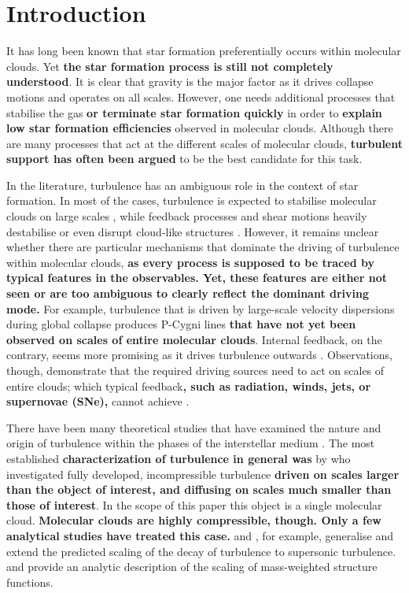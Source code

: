 \section{Introduction}\label{intro}

It has long been known that star formation preferentially occurs within molecular clouds. 
Yet \textbf{the star formation process is still not completely understood}.
It is clear that gravity is the major factor as it drives collapse motions and operates on all scales.
However, one needs additional processes that stabilise the gas \textbf{or terminate star formation quickly} in order to \textbf{explain low star formation efficiencies} observed in molecular clouds. 
Although there are many processes that act at the different scales of molecular clouds, \textbf{turbulent support has often been argued} to be the best candidate for this task.

In the literature, turbulence has an ambiguous role in the context of star formation. 
In most of the cases, turbulence is expected to stabilise molecular clouds on large scales \citep{Fleck1980,McKee1992,MacLow2003}, while feedback processes and shear motions heavily destabilise or even disrupt cloud-like structures \citep{Tan2013,Miyamoto2014}. 
However, it remains unclear whether there are particular mechanisms that dominate the driving of turbulence within molecular clouds, \textbf{as every process is supposed to be traced by typical features in the observables.
Yet, these features are either not seen or are too ambiguous to clearly reflect the dominant driving mode.}
For example, turbulence that is driven by large-scale velocity dispersions during global collapse \citep{Ballesteros2011a,Ballesteros2011b,Hartmann2012} produces P-Cygni lines \textbf{ that have not yet been observed on scales of entire molecular clouds}. 
Internal feedback, on the contrary, seems more promising as it drives turbulence outwards \citep{Dekel2013,Krumholz2014}.
Observations, though, demonstrate that the required driving sources need to act on scales of entire clouds; which typical feedback\textbf{, such as radiation, winds, jets, or supernovae (SNe),} cannot achieve \citep{Heyer2004,Brunt2009,Brunt2013}.

There have been many theoretical studies that have examined the nature and origin of turbulence within the phases of the interstellar medium \citep[ISM;][and references within]{MacLow2004}. 
The most established \textbf{characterization of turbulence in general was} by \citet{Kolmogorov1941} who investigated fully developed, incompressible turbulence \textbf{driven on scales larger than the object of interest, and diffusing on scales much smaller than those of interest}.
In the scope of this paper this object is a single molecular cloud. 
\textbf{Molecular clouds are highly compressible, though.
Only a few analytical studies have treated this case.}
\citet{She1994} and \citet{Boldyrev2002}, for example, generalise and extend the predicted scaling of the decay of turbulence to supersonic turbulence.
\citet{Galtier2011} and \citet{Banerjee2013} provide an analytic description of the scaling of mass-weighted structure functions.

